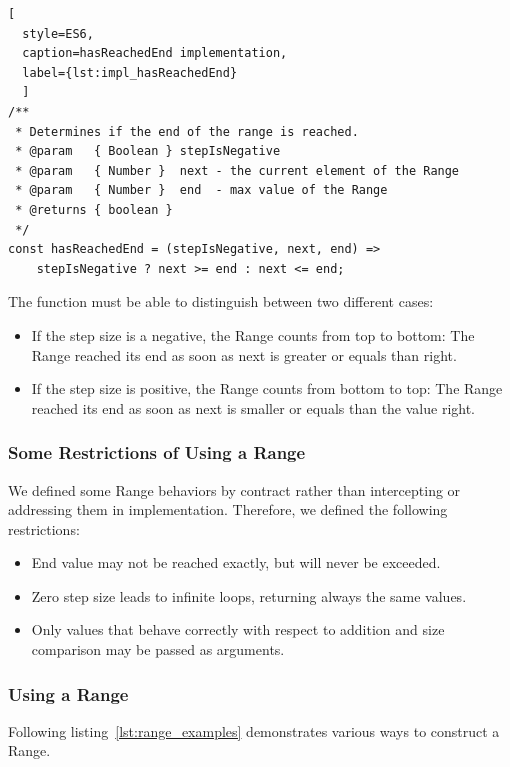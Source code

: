 \begin{lstlisting}[
  style=ES6, 
  caption=hasReachedEnd implementation,
  label={lst:impl_hasReachedEnd}
  ]
/**
 * Determines if the end of the range is reached.
 * @param   { Boolean } stepIsNegative
 * @param   { Number }  next - the current element of the Range
 * @param   { Number }  end  - max value of the Range
 * @returns { boolean }
 */
const hasReachedEnd = (stepIsNegative, next, end) =>
    stepIsNegative ? next >= end : next <= end;
\end{lstlisting}

The function must be able to distinguish between two different cases:

\begin{itemize}
  \item{If the step size is a negative, the Range counts from top to bottom:
    The Range reached its end as soon as next is greater or equals than right.}
  \item{If the step size is positive, the Range counts from bottom to top: The
  Range reached its end as soon as next is smaller or equals than the value right.}
\end{itemize}

\subsubsection{Some Restrictions of Using a Range}
\label{subsub:Some Restrictions of Using a Range}
We defined some Range behaviors by contract rather than intercepting or
addressing them in implementation. Therefore, we defined the following
restrictions:

\begin{itemize}
  \item{End value may not be reached exactly, but will never be exceeded.}
  \item{Zero step size leads to infinite loops, returning always the same values.}
  \item{Only values that behave correctly with respect to addition and size
    comparison may be passed as arguments.}
\end{itemize}


\subsubsection{Using a Range}
\label{subsub:Using a Range}
Following listing~\ref{lst:range_examples} demonstrates various ways to
construct a Range.

